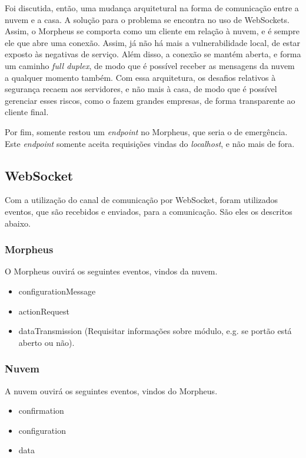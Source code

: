 Foi discutida, então, uma mudança arquitetural na forma de comunicação entre a nuvem e a casa. A solução para o problema se encontra no uso de WebSockets. Assim, o Morpheus se comporta como um cliente em relação à nuvem, e é sempre ele que abre uma conexão. Assim, já não há mais a vulnerabilidade local, de estar exposto às negativas de serviço. Além disso, a conexão se mantém aberta, e forma um caminho \textit{full duplex}, de modo que é possível receber as mensagens da nuvem a qualquer momento também. Com essa arquitetura, os desafios relativos à segurança recaem aos servidores, e não mais à casa, de modo que é possível gerenciar esses riscos, como o fazem grandes empresas, de forma transparente ao cliente final.

Por fim, somente restou um \textit{endpoint} no Morpheus, que seria o de emergência. Este \textit{endpoint} somente aceita requisições vindas do \textit{localhost}, e não mais de fora.

\subsection{WebSocket}
Com a utilização do canal de comunicação por WebSocket, foram utilizados eventos, que são recebidos e enviados, para a comunicação. São eles os descritos abaixo.

\subsubsection{Morpheus}
O Morpheus ouvirá os seguintes eventos, vindos da nuvem.

\begin{itemize}
\item configurationMessage
\item actionRequest
\item dataTransmission (Requisitar informações sobre módulo, e.g. se portão está aberto ou não).
\end{itemize}

\subsubsection{Nuvem}
A nuvem ouvirá os seguintes eventos, vindos do Morpheus.

\begin{itemize}
\item confirmation
\item configuration
\item data
\end{itemize}

